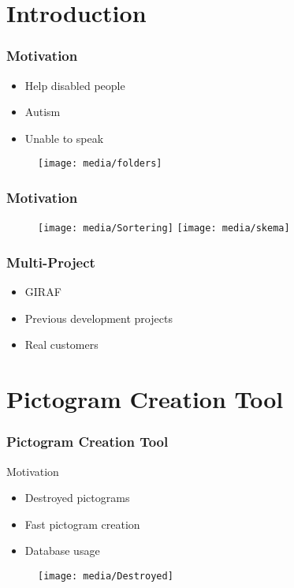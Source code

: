 


\section{Introduction}
\begin{frame}
	\frametitle{Motivation}
	\begin{itemize}
		\item Help disabled people
		\item Autism
		\item Unable to speak
	\end{itemize}
	\begin{figure}
		\texttt{[image: media/folders]}
	\end{figure}
\end{frame}

\begin{frame}
	\frametitle{Motivation}
	\begin{figure}
		\texttt{[image: media/Sortering]}		
		\hfill
		\texttt{[image: media/skema]}
	\end{figure}
\end{frame}

\begin{frame}
	\frametitle{Multi-Project}
	\begin{itemize}
		\item GIRAF
		\item Previous development projects
		\item Real customers
	\end{itemize}
\end{frame}
	
	
	
\section{Pictogram Creation Tool}
\begin{frame}
	\frametitle{Pictogram Creation Tool}
	Motivation
	\begin{itemize}
		\item Destroyed pictograms
		\item Fast pictogram creation
		\item Database usage
	\end{itemize}
	\begin{figure}
		\texttt{[image: media/Destroyed]}
	\end{figure}
\end{frame}

